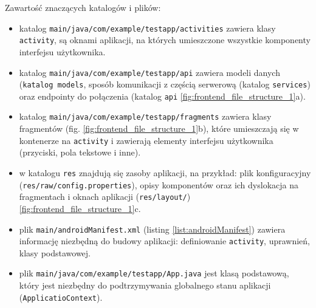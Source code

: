 Zawartość znaczących katalogów i plików:
\begin{itemize}
    \item katalog \texttt{main/java/com/example/testapp/activities} zawiera klasy \texttt{activity}, są oknami aplikacji, na których umieszczone wszystkie komponenty interfejsu użytkownika.
    \item katalog \texttt{main/java/com/example/testapp/api} zawiera modeli danych (\texttt{katalog models}, sposób komunikacji z częścią serwerową (katalog \texttt{services}) oraz endpointy do połączenia (katalog \texttt{api} \ref{fig:frontend_file_structure_1}a).
    \item katalog \texttt{main/java/com/example/testapp/fragments} zawiera klasy fragmentów (fig. \ref{fig:frontend_file_structure_1}b), które umieszczają się w kontenerze na \texttt{activity} i zawierają elementy interfejsu użytkownika (przyciski, pola tekstowe i inne).
    \item w katalogu \texttt{res} znajdują się zasoby aplikacji, na przykład: plik konfiguracyjny (\texttt{res/raw/config.properties}), opisy komponentów oraz ich dyslokacja na fragmentach i oknach aplikacji (\texttt{res/layout/}) \ref{fig:frontend_file_structure_1}c.
    \item plik \texttt{main/androidManifest.xml} (listing \ref{list:androidManifest}) zawiera informację niezbędną do budowy aplikacji: definiowanie \texttt{activity}, uprawnień, klasy podstawowej.
    \item plik \texttt{main/java/com/example/testapp/App.java} jest klasą podstawową, który jest niezbędny do podtrzymywania globalnego stanu aplikacji (\texttt{ApplicatioContext}).
\end{itemize}
